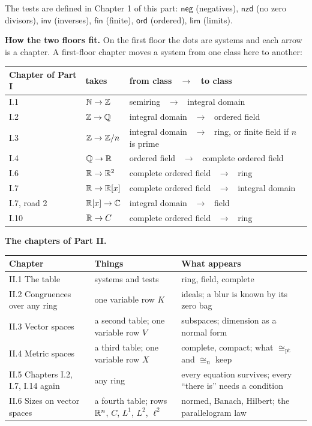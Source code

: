 The tests are defined in Chapter 1 of this part: $\mathsf{neg}$ (negatives), $\mathsf{nzd}$ (no zero divisors), $\mathsf{inv}$ (inverses), $\mathsf{fin}$ (finite), $\mathsf{ord}$ (ordered), $\mathsf{lim}$ (limits).

\textbf{How the two floors fit.} On the first floor the dots are systems and each arrow is a chapter. A first-floor chapter moves a system from one class here to another:
\begin{center}
\renewcommand{\arraystretch}{1.3}
\begin{tabular}{@{}l l >{\raggedright\arraybackslash}p{8.2cm}@{}}
\textbf{Chapter of Part I} & \textbf{takes} & \textbf{from class \ $\to$ \ to class} \\ \hline
I.1 & $\mathbb{N} \to \mathbb{Z}$ & semiring \ $\to$ \ integral domain \\
I.2 & $\mathbb{Z} \to \mathbb{Q}$ & integral domain \ $\to$ \ ordered field \\
I.3 & $\mathbb{Z} \to \mathbb{Z}/n$ & integral domain \ $\to$ \ ring, or finite field if $n$ is prime \\
I.4 & $\mathbb{Q} \to \mathbb{R}$ & ordered field \ $\to$ \ complete ordered field \\
I.6 & $\mathbb{R} \to \mathbb{R}^2$ & complete ordered field \ $\to$ \ ring \\
I.7 & $\mathbb{R} \to \mathbb{R}[x]$ & complete ordered field \ $\to$ \ integral domain \\
I.7, road 2 & $\mathbb{R}[x] \to \mathbb{C}$ & integral domain \ $\to$ \ field \\
I.10 & $\mathbb{R} \to C$ & complete ordered field \ $\to$ \ ring \\
\end{tabular}
\end{center}

\textbf{The chapters of Part II.}
\begin{center}
\renewcommand{\arraystretch}{1.3}
{\small
\begin{tabular}{@{}>{\raggedright\arraybackslash}p{4.4cm} >{\raggedright\arraybackslash}p{4.4cm} >{\raggedright\arraybackslash}p{5.6cm}@{}}
\textbf{Chapter} & \textbf{Things} & \textbf{What appears} \\ \hline
II.1 The table & systems and tests & ring, field, complete \\
II.2 Congruences over any ring & one variable row $K$ & ideals; a blur is known by its zero bag \\
II.3 Vector spaces & a second table; one variable row $V$ & subspaces; dimension as a normal form \\
II.4 Metric spaces & a third table; one variable row $X$ & complete, compact; what $\cong_{\mathrm{pt}}$ and $\cong_{\mathrm{u}}$ keep \\
II.5 Chapters I.2, I.7, I.14 again & any ring & every equation survives; every ``there is'' needs a condition \\
II.6 Sizes on vector spaces & a fourth table; rows $\mathbb{R}^n$, $C$, $L^1$, $L^2$, $\ell^2$ & normed, Banach, Hilbert; the parallelogram law \\
\end{tabular}
}
\end{center}

